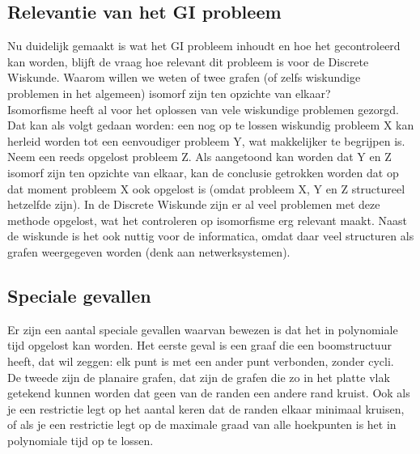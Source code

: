 \documentclass{article}
\begin{document}
\subsection{Relevantie van het GI probleem}
Nu duidelijk gemaakt is wat het GI probleem inhoudt en hoe het gecontroleerd kan worden, blijft de vraag hoe relevant dit probleem is voor de Discrete Wiskunde. Waarom willen we weten of twee grafen (of zelfs wiskundige problemen in het algemeen) isomorf zijn ten opzichte van elkaar?\\

Isomorfisme heeft al voor het oplossen van vele wiskundige problemen gezorgd. Dat kan als volgt gedaan worden: een nog op te lossen wiskundig probleem X kan herleid worden tot een eenvoudiger probleem Y, wat makkelijker te begrijpen is. Neem een reeds opgelost probleem Z. Als aangetoond kan worden dat Y en Z isomorf zijn ten opzichte van elkaar, kan de conclusie getrokken worden dat op dat moment probleem X ook opgelost is (omdat probleem X, Y en Z structureel hetzelfde zijn). In de Discrete Wiskunde zijn er al veel problemen met deze methode opgelost, wat het controleren op isomorfisme erg relevant maakt.
Naast de wiskunde is het ook nuttig voor de informatica, omdat daar veel structuren als grafen weergegeven worden (denk aan netwerksystemen).

\subsection{Speciale gevallen}
Er zijn een aantal speciale gevallen waarvan bewezen is dat het in polynomiale tijd opgelost kan worden. Het eerste geval is een graaf die een boomstructuur heeft, dat wil zeggen: elk punt is met een ander punt verbonden, zonder cycli.\\
De tweede zijn de planaire grafen, dat zijn de grafen die zo in het platte vlak getekend kunnen worden dat geen van de randen een andere rand kruist. Ook als je een restrictie legt op het aantal keren dat de randen elkaar minimaal kruisen, of als je een restrictie legt op de maximale graad van alle hoekpunten is het in polynomiale tijd op te lossen.
\pagebreak

\end{document}
